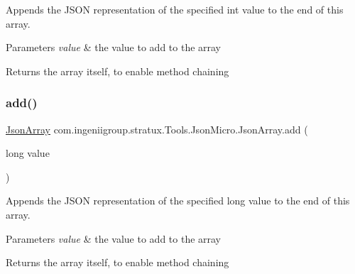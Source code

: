 Appends the J\+S\+ON representation of the specified {\ttfamily int} value to the end of this array.


\begin{DoxyParams}{Parameters}
{\em value} & the value to add to the array \\
\hline
\end{DoxyParams}
\begin{DoxyReturn}{Returns}
the array itself, to enable method chaining 
\end{DoxyReturn}
\mbox{\label{classcom_1_1ingeniigroup_1_1stratux_1_1_tools_1_1_json_micro_1_1_json_array_aa267490df513c2f12de40d1d6dfc6a49}} 
\subsubsection{\texorpdfstring{add()}{add()}\hspace{0.1cm}{\footnotesize\ttfamily [2/7]}}
{\footnotesize\ttfamily \hyperlink{classcom_1_1ingeniigroup_1_1stratux_1_1_tools_1_1_json_micro_1_1_json_array}{Json\+Array} com.\+ingeniigroup.\+stratux.\+Tools.\+Json\+Micro.\+Json\+Array.\+add (\begin{DoxyParamCaption}\item[{long}]{value }\end{DoxyParamCaption})}

Appends the J\+S\+ON representation of the specified {\ttfamily long} value to the end of this array.


\begin{DoxyParams}{Parameters}
{\em value} & the value to add to the array \\
\hline
\end{DoxyParams}
\begin{DoxyReturn}{Returns}
the array itself, to enable method chaining 
\end{DoxyReturn}
\mbox{\label{classcom_1_1ingeniigroup_1_1stratux_1_1_tools_1_1_json_micro_1_1_json_array_a6259c27321935d5dac75f1830f85591b}} 
